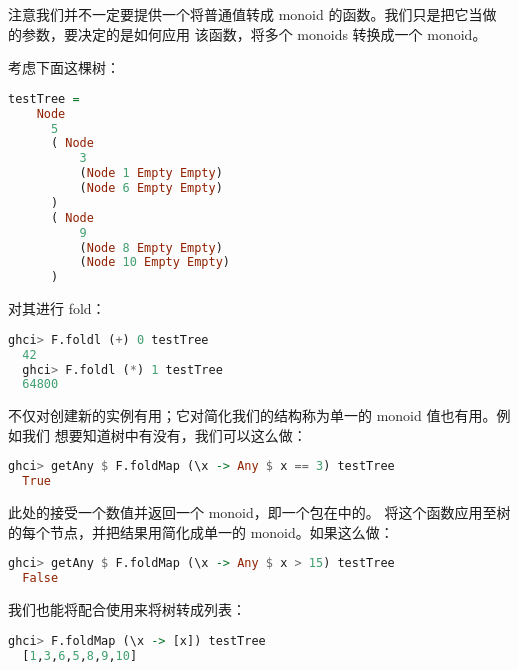 \documentclass[./main.tex]{subfiles}
\begin{document}
注意我们并不一定要提供一个将普通值转成 monoid 的函数。我们只是把它当做  的参数，要决定的是如何应用
该函数，将多个 monoids 转换成一个 monoid。

考虑下面这棵树：

\begin{lstlisting}[language=Haskell]
  testTree =
    Node
      5
      ( Node
          3
          (Node 1 Empty Empty)
          (Node 6 Empty Empty)
      )
      ( Node
          9
          (Node 8 Empty Empty)
          (Node 10 Empty Empty)
      )
\end{lstlisting}

对其进行 fold：

\begin{lstlisting}[language=Haskell]
  ghci> F.foldl (+) 0 testTree
  42
  ghci> F.foldl (*) 1 testTree
  64800
\end{lstlisting}

不仅对创建新的实例有用；它对简化我们的结构称为单一的 monoid 值也有用。例如我们
想要知道树中有没有，我们可以这么做：

\begin{lstlisting}[language=Haskell]
  ghci> getAny $ F.foldMap (\x -> Any $ x == 3) testTree
  True
\end{lstlisting}

此处的接受一个数值并返回一个 monoid，即一个包在中的。
将这个函数应用至树的每个节点，并把结果用简化成单一的 monoid。如果这么做：

\begin{lstlisting}[language=Haskell]
  ghci> getAny $ F.foldMap (\x -> Any $ x > 15) testTree
  False
\end{lstlisting}

我们也能将配合\acode{\\x -> [x]}使用来将树转成列表：

\begin{lstlisting}[language=Haskell]
  ghci> F.foldMap (\x -> [x]) testTree
  [1,3,6,5,8,9,10]
\end{lstlisting}
\end{document}
